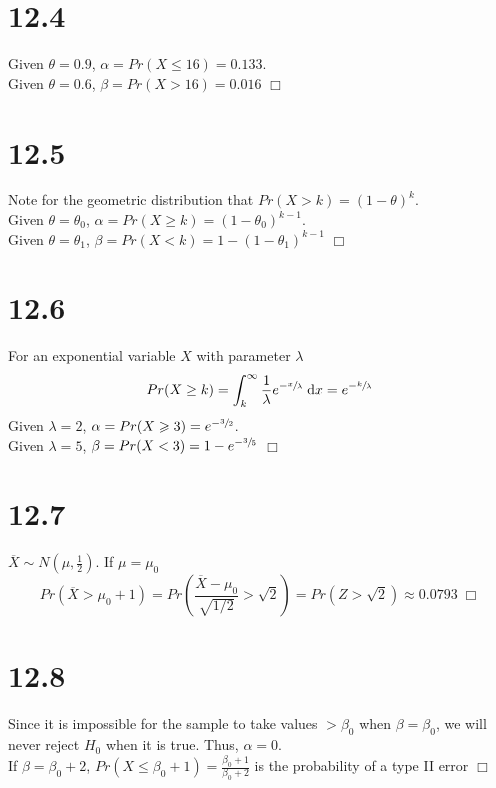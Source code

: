 \documentclass{article}
\begin{document}
\section*{12.4}
Given $\theta = 0.9$, $\alpha = Pr(X \leqslant 16) = 0.133$.\\
Given $\theta = 0.6$, $\beta = Pr(X > 16) = 0.016$ $\Box$

\section*{12.5}
Note for the geometric distribution that $Pr(X > k) = (1-\theta)^k$.\\
Given $\theta = \theta_0$, $\alpha = Pr(X \geqslant k) = (1-\theta_0)^{k-1}$.\\
Given $\theta = \theta_1$, $\beta = Pr(X < k) = 1 - (1-\theta_1)^{k-1}$ $\Box$

\section*{12.6}
For an exponential variable $X$ with parameter $\lambda$
$$Pr(X \geq k) = \int_k^\infty \frac{1}{\lambda}e^{-\sfrac{x}{\lambda}} \;\mathrm{d}x = e^{-\sfrac{k}{\lambda}}$$
Given $\lambda = 2$, $\alpha = Pr(X \geqslant 3) = e^{-\sfrac{3}{2}}$.\\
Given $\lambda = 5$, $\beta = Pr(X < 3) = 1 - e^{-\sfrac{3}{5}}$ $\Box$

\section*{12.7}
$\overline{X} \sim N(\mu, \frac{1}{2})$. If $\mu = \mu_0$
$$Pr(\overline{X} > \mu_0 + 1) = Pr(\frac{\overline{X}-\mu_0}{\sqrt{1/2}} > \sqrt{2}) = Pr(Z > \sqrt{2}) \approx 0.0793 \;\Box$$

\section*{12.8}
Since it is impossible for the sample to take values $> \beta_0$ when $\beta = \beta_0$, we will never reject $H_0$ when it is true. Thus, $\alpha = 0$.\\
If $\beta = \beta_0 + 2$, $Pr(X \leqslant \beta_0 + 1) = \frac{\beta_0 + 1}{\beta_0 + 2}$ is the probability of a type II error $\Box$
\end{document}
